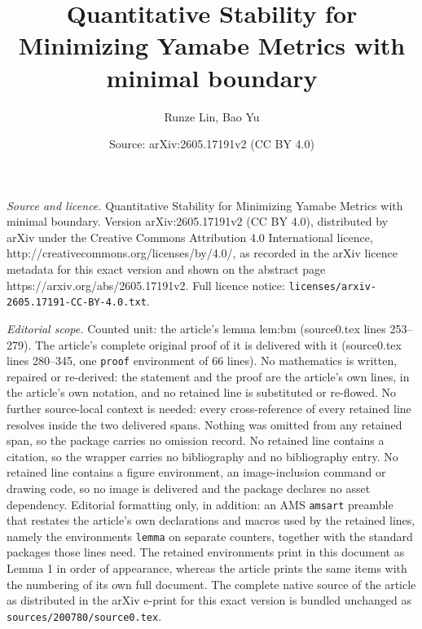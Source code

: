 \documentclass[10pt,a4paper]{amsart}
\title{Quantitative Stability for Minimizing Yamabe Metrics with minimal boundary}
\author{Runze Lin, Bao Yu}
\date{Source: arXiv:2605.17191v2 (CC BY 4.0)}
\begin{document}
\maketitle

\noindent\emph{Source and licence.} Quantitative Stability for Minimizing Yamabe Metrics with minimal boundary. Version arXiv:2605.17191v2 (CC BY 4.0), distributed by arXiv under the Creative Commons Attribution 4.0 International licence, http://creativecommons.org/licenses/by/4.0/, as recorded in the arXiv licence metadata for this exact version and shown on the abstract page https://arxiv.org/abs/2605.17191v2. Full licence notice: \texttt{licenses/arxiv-2605.17191-CC-BY-4.0.txt}.\par\smallskip

\noindent\textit{Editorial scope.} Counted unit: the article's lemma lem:bm (source0.tex lines 253--279). The article's complete original proof of it is delivered with it (source0.tex lines 280--345, one \texttt{proof} environment of 66 lines). No mathematics is written, repaired or re-derived: the statement and the proof are the article's own lines, in the article's own notation, and no retained line is substituted or re-flowed.  No further source-local context is needed: every cross-reference of every retained line resolves inside the two delivered spans.  Nothing was omitted from any retained span, so the package carries no omission record.  No retained line contains a citation, so the wrapper carries no bibliography and no bibliography entry.  No retained line contains a figure environment, an image-inclusion command or drawing code, so no image is delivered and the package declares no asset dependency.  Editorial formatting only, in addition: an AMS \texttt{amsart} preamble that restates the article's own declarations and macros used by the retained lines, namely the environments \texttt{lemma} on separate counters, together with the standard packages those lines need.  The retained environments print in this document as Lemma 1 in order of appearance, whereas the article prints the same items with the numbering of its own full document.  The complete native source of the article as distributed in the arXiv e-print for this exact version is bundled unchanged as \texttt{sources/200780/source0.tex}.
\end{document}
